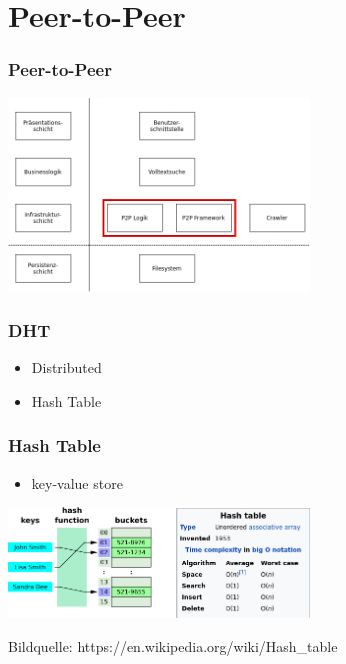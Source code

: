 \documentclass{beamer}
\begin{document}
\section{Peer-to-Peer}
\begin{frame}
  \frametitle{Peer-to-Peer}
  \includegraphics[width=8cm]{Schichten-p2p}
\end{frame}

\begin{frame}
  \frametitle{DHT}

  \begin{itemize}
    \item Distributed
    \item Hash Table
  \end{itemize}
\end{frame}

\begin{frame}
  \frametitle{Hash Table}

  \begin{itemize}
    \item key-value store
  \end{itemize}

  \medskip

  \includegraphics[width=8cm]{ht}

  \medskip

  {\tiny Bildquelle: https://en.wikipedia.org/wiki/Hash\_table}
\end{frame}
\end{document}

